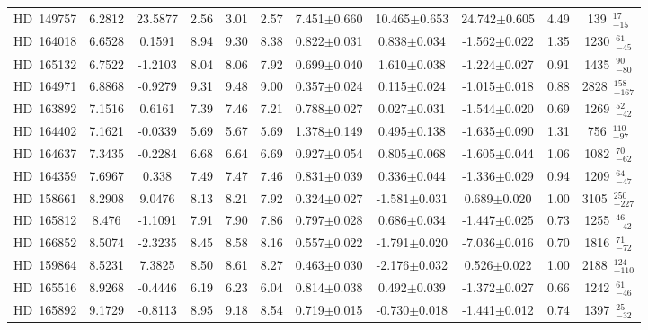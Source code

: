 {\begin{longtable}{lcccccccccc}
\noalign{\smallskip}
HD~149757 & 6.2812 & 23.5877 & 2.56 & 3.01 & 2.57 & 7.451$\pm$0.660 & 10.465$\pm$0.653 & 24.742$\pm$0.605 & 4.49 & 139~$_{-15}^{17}$ \\
\noalign{\smallskip}
HD~164018 & 6.6528 & 0.1591 & 8.94 & 9.30 & 8.38 & 0.822$\pm$0.031 & 0.838$\pm$0.034 & -1.562$\pm$0.022 & 1.35 & 1230~$_{-45}^{61}$ \\
\noalign{\smallskip}
HD~165132 & 6.7522 & -1.2103 & 8.04 & 8.06 & 7.92 & 0.699$\pm$0.040 & 1.610$\pm$0.038 & -1.224$\pm$0.027 & 0.91 & 1435~$_{-80}^{90}$ \\
\noalign{\smallskip}
HD~164971 & 6.8868 & -0.9279 & 9.31 & 9.48 & 9.00 & 0.357$\pm$0.024 & 0.115$\pm$0.024 & -1.015$\pm$0.018 & 0.88 & 2828~$_{-167}^{158}$ \\
\noalign{\smallskip}
HD~163892 & 7.1516 & 0.6161 & 7.39 & 7.46 & 7.21 & 0.788$\pm$0.027 & 0.027$\pm$0.031 & -1.544$\pm$0.020 & 0.69 & 1269~$_{-42}^{52}$ \\
\noalign{\smallskip}
HD~164402 & 7.1621 & -0.0339 & 5.69 & 5.67 & 5.69 & 1.378$\pm$0.149 & 0.495$\pm$0.138 & -1.635$\pm$0.090 & 1.31 & 756~$_{-97}^{110}$ \\
\noalign{\smallskip}
HD~164637 & 7.3435 & -0.2284 & 6.68 & 6.64 & 6.69 & 0.927$\pm$0.054 & 0.805$\pm$0.068 & -1.605$\pm$0.044 & 1.06 & 1082~$_{-62}^{70}$ \\
\noalign{\smallskip}
HD~164359 & 7.6967 & 0.338 & 7.49 & 7.47 & 7.46 & 0.831$\pm$0.039 & 0.336$\pm$0.044 & -1.336$\pm$0.029 & 0.94 & 1209~$_{-47}^{64}$ \\
\noalign{\smallskip}
HD~158661 & 8.2908 & 9.0476 & 8.13 & 8.21 & 7.92 & 0.324$\pm$0.027 & -1.581$\pm$0.031 & 0.689$\pm$0.020 & 1.00 & 3105~$_{-227}^{250}$ \\
\noalign{\smallskip}
HD~165812 & 8.476 & -1.1091 & 7.91 & 7.90 & 7.86 & 0.797$\pm$0.028 & 0.686$\pm$0.034 & -1.447$\pm$0.025 & 0.73 & 1255~$_{-42}^{46}$ \\
\noalign{\smallskip}
HD~166852 & 8.5074 & -2.3235 & 8.45 & 8.58 & 8.16 & 0.557$\pm$0.022 & -1.791$\pm$0.020 & -7.036$\pm$0.016 & 0.70 & 1816~$_{-72}^{71}$ \\
\noalign{\smallskip}
HD~159864 & 8.5231 & 7.3825 & 8.50 & 8.61 & 8.27 & 0.463$\pm$0.030 & -2.176$\pm$0.032 & 0.526$\pm$0.022 & 1.00 & 2188~$_{-110}^{124}$ \\
\noalign{\smallskip}
HD~165516 & 8.9268 & -0.4446 & 6.19 & 6.23 & 6.04 & 0.814$\pm$0.038 & 0.492$\pm$0.039 & -1.372$\pm$0.027 & 0.66 & 1242~$_{-46}^{61}$ \\
\noalign{\smallskip}
HD~165892 & 9.1729 & -0.8113 & 8.95 & 9.18 & 8.54 & 0.719$\pm$0.015 & -0.730$\pm$0.018 & -1.441$\pm$0.012 & 0.74 & 1397~$_{-32}^{25}$ \\

\end{longtable}}
